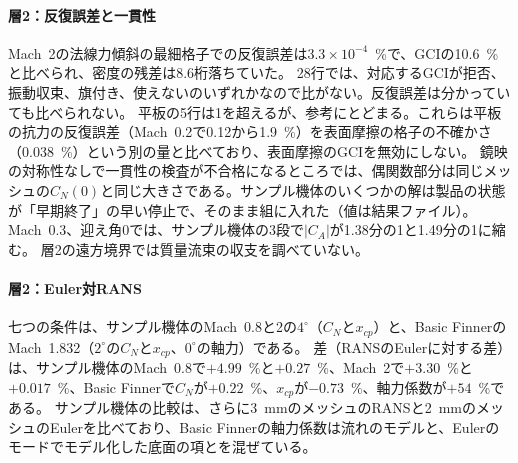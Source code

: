 \documentclass[twocolumn]{labreport}
\begin{document}
\paragraph{層2：反復誤差と一貫性}
Mach~2の法線力傾斜の最細格子での反復誤差は$3.3\times10^{-4}$~\%で、GCIの10.6~\%と比べられ、密度の残差は8.6桁落ちていた。
28行では、対応するGCIが拒否、振動収束、旗付き、使えないのいずれかなので比がない。反復誤差は分かっていても比べられない。
平板の5行は1を超えるが、参考にとどまる。これらは平板の抗力の反復誤差（Mach~0.2で0.12から1.9~\%）を表面摩擦の格子の不確かさ（0.038~\%）という別の量と比べており、表面摩擦のGCIを無効にしない。
鏡映の対称性なしで一貫性の検査が不合格になるところでは、偶関数部分は同じメッシュの$C_N(0)$と同じ大きさである。サンプル機体のいくつかの解は製品の状態が「早期終了」の早い停止で、そのまま組に入れた（値は結果ファイル）。
Mach~0.3、迎え角0では、サンプル機体の3段で$|C_A|$が1.38分の1と1.49分の1に縮む。
層2の遠方境界では質量流束の収支を調べていない。

\paragraph{層2：Euler対RANS}
七つの条件は、サンプル機体のMach~0.8と2の$4^\circ$（$C_N$と$x_{cp}$）と、Basic FinnerのMach~1.832（$2^\circ$の$C_N$と$x_{cp}$、$0^\circ$の軸力）である。
差（RANSのEulerに対する差）は、サンプル機体のMach~0.8で$+4.99$~\%と$+0.27$~\%、Mach~2で$+3.30$~\%と$+0.017$~\%、Basic Finnerで$C_N$が$+0.22$~\%、$x_{cp}$が$-0.73$~\%、軸力係数が$+54$~\%である。
サンプル機体の比較は、さらに3~mmのメッシュのRANSと2~mmのメッシュのEulerを比べており、Basic Finnerの軸力係数は流れのモデルと、Eulerのモードでモデル化した底面の項とを混ぜている。
\end{document}
